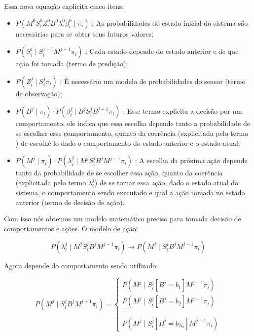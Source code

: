 Essa nova equação explicita cinco itens:


\begin{itemize}
    \item $ P \left( M^0 S_i^0 Z_i^0 B^0 \lambda_i^0 \beta_i^0 \mid \pi_i \right) $ : As probabilidades do estado inicial do sistema são necessárias para se obter seus futuros valores;
    \item $ P \left( S_i^j \mid S_i^{j-1} M^{j-1} \pi_i \right) $ : Cada estado depende do estado anterior e de que ação foi tomada (termo de predição);
    \item $ P \left( Z_i^j \mid S_i^j \pi_i \right) $ : É necessário um modelo de probabilidades do sensor (termo de observação);
    \item $ P \left( B^j \mid \pi_i \right) \cdot P \left( \beta_i^j \mid B^j S_i^j B^{j-1} \pi_i \right) $ : Esse termo explicita a decisão por um comportamento, ele indica que essa escolha depende tanto a probabilidade de se escolher esse comportamento, quanto da coerência (explicitada pelo termo ) de escolhê-lo dado o comportamento do estado anterior e o estado atual;
    \item $ P \left( M^j \mid \pi_i \right) \cdot P \left( \lambda_i^j \mid M^j S_i^j B^j M^{j-1} \pi_i \right) $ : A escolha da próxima ação depende tanto da probabilidade de se escolher essa ação, quanto da coerência (explicitada pelo termo $ \lambda_i^j $) de se tomar essa ação, dado o estado atual do sistema, o comportamento sendo executado e qual a ação tomada no estado anterior (termo de decisão de ação).
\end{itemize}

Com isso nós obtemos um modelo matemático preciso para tomada decisão de comportamentos e ações. O modelo de ação:

\begin{equation}
    P \left( \lambda_i^j \mid M^j S_i^j B^j M^{j-1} \pi_i \right) \rightarrow P \left( M^j \mid S_i^j B^j M^{j-1} \pi_i \right)
\end{equation}

Agora depende do comportamento sendo utilizado:

\begin{equation}
    P \left( M^j \mid S_i^j B^j M^{j-1} \pi_i \right) = 
        \left\{
            \begin{array}{l}
                P \left( M^j \mid S_i^j \left[ B^j=b_1 \right] M^{j-1} \pi_i \right) \\
                P \left( M^j \mid S_i^j \left[ B^j=b_2 \right] M^{j-1} \pi_i \right) \\
                \cdots \\
                P \left( M^j \mid S_i^j \left[ B^j=b_{N_b} \right] M^{j-1} \pi_i \right)
            \end{array}
        \right.
\end{equation}

